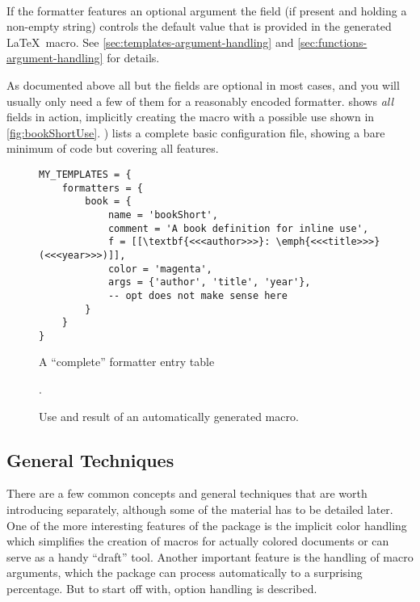 \documentclass{scrartcl}
\begin{document}
\paragraph{}

If the formatter features an optional argument the  field (if
present and holding a non-empty string) controls the default value that is
provided in the generated \LaTeX\ macro.  See
\vref{sec:templates-argument-handling} and
\vref{sec:functions-argument-handling} for details.

\bigskip

As documented above all but the  fields are optional in most cases,
and you will usually only need a few of them for a reasonably encoded formatter.
 shows \emph{all} fields in action, implicitly creating the
macro  with a possible use shown in
\vref{fig:bookShortUse}. ) lists a complete basic
configuration file, showing a bare minimum of code but covering all features.

\begin{figure}
\begin{verbatim}
MY_TEMPLATES = {
    formatters = {
        book = {
            name = 'bookShort',
            comment = 'A book definition for inline use',
            f = [[\textbf{<<<author>>>}: \emph{<<<title>>>} (<<<year>>>)]],
            color = 'magenta',
            args = {'author', 'title', 'year'},
            -- opt does not make sense here
        }
    }
}
\end{verbatim}
\caption{A “complete” formatter entry table}
\label{fig:bookShort}
\end{figure}

\begin{figure}
.
\caption{Use and result of an automatically generated macro.}
\label{fig:bookShortUse}
\end{figure}


\subsection{General Techniques}
\label{sec:general-techniques}

There are a few common concepts and general techniques that are worth introducing separately,
although some of the material has to be detailed later.  One of the more
interesting features of the  package is the implicit color
handling which simplifies the creation of macros for actually colored documents
or can serve as a handy “draft” tool.  Another important feature is the handling
of macro arguments, which the package can process automatically to a surprising
percentage.  But to start off with, option handling is described.
\end{document}
